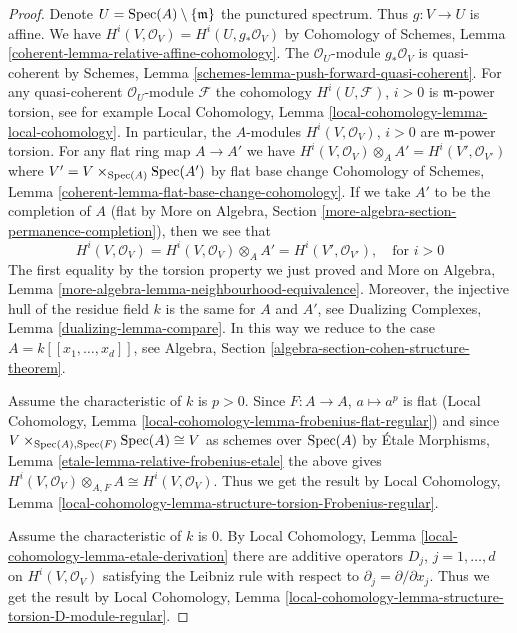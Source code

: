 \begin{proof}
Denote $U = \mathop{\mathrm{Spec}}(A) \setminus \{\mathfrak m\}$ the punctured spectrum.
Thus $g : V \to U$ is affine.
We have $H^i(V, \mathcal{O}_V) = H^i(U, g_*\mathcal{O}_V)$ by
Cohomology of Schemes, Lemma \ref{coherent-lemma-relative-affine-cohomology}.
The $\mathcal{O}_U$-module $g_*\mathcal{O}_V$ is quasi-coherent by
Schemes, Lemma \ref{schemes-lemma-push-forward-quasi-coherent}.
For any quasi-coherent $\mathcal{O}_U$-module $\mathcal{F}$
the cohomology $H^i(U, \mathcal{F})$, $i > 0$
is $\mathfrak m$-power torsion, see for example
Local Cohomology, Lemma \ref{local-cohomology-lemma-local-cohomology}.
In particular, the $A$-modules $H^i(V, \mathcal{O}_V)$, $i > 0$
are $\mathfrak m$-power torsion.
For any flat ring map $A \to A'$ we have
$H^i(V, \mathcal{O}_V) \otimes_A A' = H^i(V', \mathcal{O}_{V'})$
where $V' = V \times_{\mathop{\mathrm{Spec}}(A)} \mathop{\mathrm{Spec}}(A')$ by flat base change
Cohomology of Schemes, Lemma \ref{coherent-lemma-flat-base-change-cohomology}.
If we take $A'$ to be the completion of $A$ (flat by
More on Algebra, Section \ref{more-algebra-section-permanence-completion}),
then we see that
$$
H^i(V, \mathcal{O}_V) = H^i(V, \mathcal{O}_V) \otimes_A A' =
H^i(V', \mathcal{O}_{V'}),\quad\text{for } i > 0
$$
The first equality by the torsion property we just proved and
More on Algebra, Lemma \ref{more-algebra-lemma-neighbourhood-equivalence}.
Moreover, the injective hull of the residue field $k$
is the same for $A$ and $A'$, see
Dualizing Complexes, Lemma \ref{dualizing-lemma-compare}.
In this way we reduce to the case $A = k[[x_1, \ldots, x_d]]$, see
Algebra, Section \ref{algebra-section-cohen-structure-theorem}.

\medskip\noindent
Assume the characteristic of $k$ is $p > 0$. Since $F : A \to A$,
$a \mapsto a^p$ is flat (Local Cohomology, Lemma
\ref{local-cohomology-lemma-frobenius-flat-regular})
and since $V \times_{\mathop{\mathrm{Spec}}(A), \mathop{\mathrm{Spec}}(F)} \mathop{\mathrm{Spec}}(A) \cong V$ as schemes
over $\mathop{\mathrm{Spec}}(A)$ by
\'Etale Morphisms, Lemma \ref{etale-lemma-relative-frobenius-etale}
the above gives
$H^i(V, \mathcal{O}_V) \otimes_{A, F} A \cong H^i(V, \mathcal{O}_V)$.
Thus we get the result by
Local Cohomology, Lemma
\ref{local-cohomology-lemma-structure-torsion-Frobenius-regular}.

\medskip\noindent
Assume the characteristic of $k$ is $0$. By
Local Cohomology, Lemma \ref{local-cohomology-lemma-etale-derivation}
there are additive operators $D_j$, $j = 1, \ldots, d$ on
$H^i(V, \mathcal{O}_V)$ satisfying the Leibniz rule with
respect to $\partial_j = \partial/\partial x_j$.
Thus we get the result by
Local Cohomology,
Lemma \ref{local-cohomology-lemma-structure-torsion-D-module-regular}.
\end{proof}

